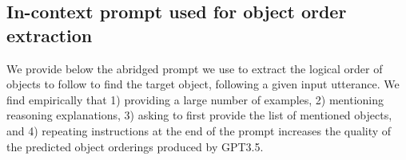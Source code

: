 

\subsection{In-context prompt used for object order extraction}
\label{appendix_In_context_prompt_used_for_object_order_extraction}

We provide below the abridged prompt we use to extract the logical order of objects to follow to find the target object, following a given input utterance. We find empirically that 1) providing a large number of examples, 2) mentioning reasoning explanations, 3) asking to first provide the list of mentioned objects, and 4) repeating instructions at the end of the prompt increases the quality of the predicted object orderings produced by GPT3.5.

